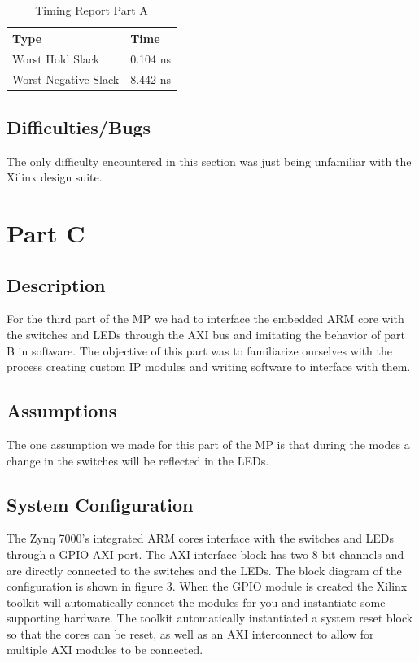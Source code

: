 \documentclass[letterpaper, 10 pt, conference]{IEEEconf}  %
\begin{document}
\begin{table}[H]
\centering
\caption{Timing Report Part A}
\label{table_example}
\begin{tabular}{|l|l|}
\hline
\rowcolor[HTML]{EFEFEF} 
Type                 & Time     \\ \hline
Worst Hold Slack     & 0.104 ns \\ \hline
Worst Negative Slack & 8.442 ns \\ \hline
\end{tabular}
\end{table}

\subsection{Difficulties/Bugs}
The only difficulty encountered in this section was just being unfamiliar with the Xilinx design suite.



\section{Part C}
\subsection{Description}
For the third part of the MP we had to interface the embedded ARM core with the switches and LEDs through the AXI bus and imitating the behavior of part B in software. The objective of this part was to familiarize ourselves with the process creating custom IP modules and writing software to interface with them.

\subsection{Assumptions}
The one assumption we made for this part of the MP is that during the modes a change in the switches will be reflected in the LEDs.

\subsection{System Configuration}
The Zynq 7000's integrated ARM cores interface with the switches and LEDs through a GPIO AXI port. The AXI interface block has two 8 bit channels and are directly connected to the switches and the LEDs. The block diagram of the configuration is shown in figure 3. When the GPIO module is created the Xilinx toolkit will automatically connect the modules for you and instantiate some supporting hardware. The toolkit automatically instantiated a system reset block so that the cores can be reset, as well as an AXI interconnect to allow for multiple AXI modules to be connected.
\end{document}
